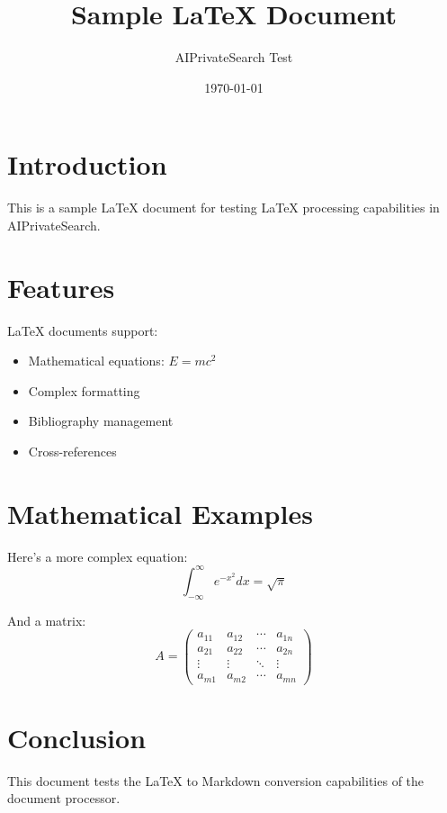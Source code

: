 \documentclass{article}
\title{Sample LaTeX Document}
\author{AIPrivateSearch Test}
\date{\today}
\begin{document}
\maketitle

\section{Introduction}

This is a sample \LaTeX{} document for testing LaTeX processing capabilities in AIPrivateSearch.

\section{Features}

\LaTeX{} documents support:
\begin{itemize}
    \item Mathematical equations: $E = mc^2$
    \item Complex formatting
    \item Bibliography management
    \item Cross-references
\end{itemize}

\section{Mathematical Examples}

Here's a more complex equation:
\begin{equation}
    \int_{-\infty}^{\infty} e^{-x^2} dx = \sqrt{\pi}
\end{equation}

And a matrix:
\begin{equation}
    A = \begin{pmatrix}
        a_{11} & a_{12} & \cdots & a_{1n} \\
        a_{21} & a_{22} & \cdots & a_{2n} \\
        \vdots & \vdots & \ddots & \vdots \\
        a_{m1} & a_{m2} & \cdots & a_{mn}
    \end{pmatrix}
\end{equation}

\section{Conclusion}

This document tests the LaTeX to Markdown conversion capabilities of the document processor.
\end{document}
